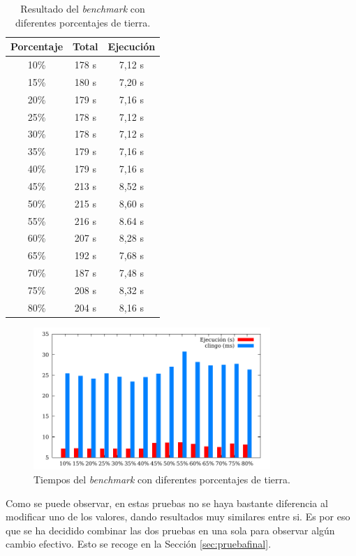\begin{table}[!h]
	\centering
	\begin{tabular}{ c c c }
		\bfseries{Porcentaje} & \bfseries{Total} & \bfseries{Ejecución} \\
		\hline
		10\% & 178 s & 7,12 s \\
		15\% & 180 s & 7,20 s \\
		20\% & 179 s & 7,16 s \\
		25\% & 178 s & 7,12 s \\
		30\% & 178 s & 7,12 s \\
		35\% & 179 s & 7,16 s \\
		40\% & 179 s & 7,16 s \\
		45\% & 213 s & 8,52 s \\
		50\% & 215 s & 8,60 s \\
		55\% & 216 s & 8.64 s \\
		60\% & 207 s & 8,28 s \\
		65\% & 192 s & 7,68 s \\
		70\% & 187 s & 7,48 s \\
		75\% & 208 s & 8,32 s \\
		80\% & 204 s & 8,16 s \\
		\hline
	\end{tabular}
	\caption{Resultado del \textit{benchmark} con diferentes porcentajes de tierra.}\label{table:biomaresult}
\end{table}

\begin{figure}[!h]
	\centering
	\includegraphics[width=0.8\textwidth]{tables/bioma-size.pdf}
	\caption{Tiempos del \textit{benchmark} con diferentes porcentajes de tierra.}\label{fig:biomaresult}
\end{figure}

Como se puede observar, en estas pruebas no se haya bastante diferencia al modificar uno de los valores, dando resultados muy similares entre si. Es por eso que se ha decidido combinar las dos pruebas en una sola para observar algún cambio efectivo. Esto se recoge en la Sección \ref{sec:pruebafinal}.


